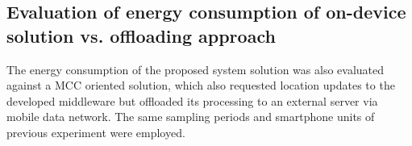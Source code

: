\documentclass[ENG,PhD]{cinvestav}
\begin{document}
\subsection{Evaluation of energy consumption of on-device solution vs. offloading approach}
The energy consumption of the proposed system solution was also evaluated against a MCC oriented solution, which also requested location updates to the developed middleware but offloaded its processing to an external server via mobile data network.
The same sampling periods and smartphone units of previous experiment were employed.


\begin{table}
\centering
{}
\end{table}
\end{document}

